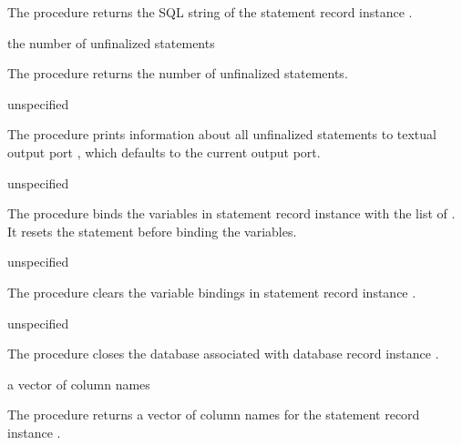 The  procedure returns the SQL string of the
statement record instance .

\begin{procedure}
\end{procedure}
\returns{} the number of unfinalized statements

The  procedure returns the number of unfinalized
statements.

\begin{procedure}
\end{procedure}
\returns{} unspecified

The  procedure prints information about all
unfinalized statements to textual output port , which defaults
to the current output port.

\begin{procedure}
\end{procedure}
\returns{} unspecified

The  procedure binds the variables in statement
record instance  with the list of . It resets
the statement before binding the variables.

\begin{procedure}
\end{procedure}
\returns{} unspecified

The  procedure clears the variable
bindings in statement record instance .

\begin{procedure}
\end{procedure}
\returns{} unspecified

The  procedure closes the database associated with
database record instance .

\begin{procedure}
\end{procedure}
\returns{} a vector of column names

The  procedure returns a vector of column names
for the statement record instance .

